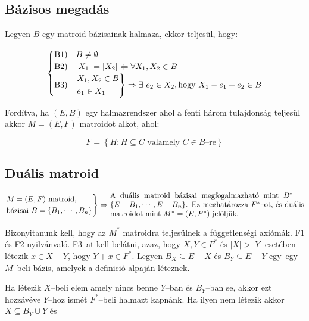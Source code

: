 \subsection{Bázisos megadás}
Legyen $B$ egy matroid bázisainak halmaza, ekkor teljesül, hogy:

\[
	\begin{cases}
		\mbox{B1)} & B \neq \emptyset                                                            \\
		\mbox{B2)} & |X_1|=|X_2| \Leftarrow \forall X_1,X_2 \in B                                \\
		\mbox{B3)} & \begin{rcases}
			             X_1, X_2 \in B \\
			             e_1 \in X_1
		             \end{rcases}\Rightarrow \exists~e_2 \in X_2, \mbox{hogy } X_1-e_1+e_2 \in B \\
	\end{cases}
\]

Fordítva, ha $(E,B)$ egy halmazrendszer ahol a fenti három tulajdonság teljesül akkor $M=(E,F)$
matroidot alkot, ahol:

\[
	F = \left\{H: H \subseteq C \mbox{ valamely } C \in B\mbox{--re}\right\}
\]

\subsection{Duális matroid}

\[
	\begin{rcases}
		M=(E,F) \mbox{ matroid}, \\
		\mbox{bázisai } B=\{B_1, \cdots, B_n\}
	\end{rcases} \Rightarrow
	\parbox[L]{9cm} {
	A duális matroid bázisai megfogalmazható mint $B^*=\{E-B_1, \cdots, E-B_n\}$.
	Ez meghatározza $F^*$--ot, és duális matroidot mint $M^*=(E,F^*)$ jelöljük.}
\]

Bizonyitanunk kell, hogy az $M^*$ matroidra teljesülnek a függetlenségi axiómák.
F$1$ és F$2$ nyilvánvaló. F$3$--at kell belátni, azaz, hogy $X,Y \in F^*$ és
$|X|>|Y|$ esetében létezik $x \in X-Y$, hogy $Y+x \in F^*$. Legyen $B_X
	\subseteq E-X$ és $B_Y\subseteq E-Y$ egy--egy $M$--beli bázis, amelyek a
definició alpaján léteznek.

Ha létezik $X$--beli elem amely nincs benne $Y$--ban és $B_Y$--ban se, akkor
ezt hozzávéve $Y$--hoz ismét $F^*$--beli halmazt kapnánk. Ha ilyen nem létezik akkor
$X \subseteq B_Y \cup Y$ és

